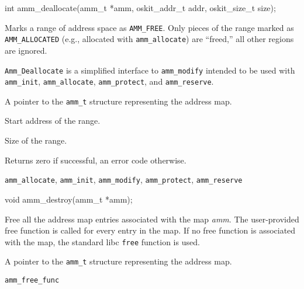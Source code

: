 \begin{apisyn}

	\funcproto int amm_deallocate(amm_t *amm,
			oskit_addr_t addr, oskit_size_t size);
\end{apisyn}
\begin{apidesc}
	Marks a range of address space as {\tt AMM_FREE}.
	Only pieces of the range marked as {\tt AMM_ALLOCATED}
	(e.g., allocated with {\tt amm_allocate})
	are ``freed,'' all other regions are ignored.

	{\tt Amm_Deallocate} is a simplified interface to {\tt amm_modify}
	intended to be used with {\tt amm_init}, {\tt amm_allocate},
	{\tt amm_protect}, and {\tt amm_reserve}.
\end{apidesc}
\begin{apiparm}
	\item[amm]
		A pointer to the {\tt amm_t} structure
		representing the address map.
	\item[addr]
		Start address of the range.
	\item[size]
		Size of the range.
\end{apiparm}
\begin{apiret}
	Returns zero if successful, an error code otherwise.
\end{apiret}
\begin{apirel}
	{\tt amm_allocate}, {\tt amm_init}, {\tt amm_modify},
	{\tt amm_protect}, {\tt amm_reserve}
\end{apirel}


\begin{apisyn}

	\funcproto void amm_destroy(amm_t *amm);
\end{apisyn}
\begin{apidesc}
	Free all the address map entries associated with the map \emph{amm}.
	The user-provided free function is called for every entry in the
	map.
	If no free function is associated with the map,
	the standard libc {\tt free} function is used.
\end{apidesc}
\begin{apiparm}
	\item[amm]
		A pointer to the {\tt amm_t} structure
		representing the address map.
\end{apiparm}
\begin{apirel}
	{\tt amm_free_func}
\end{apirel}


